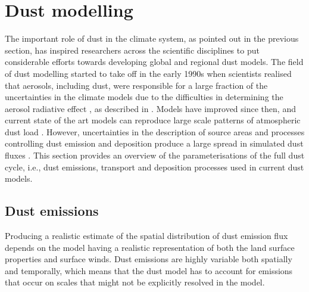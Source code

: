 \section{Dust modelling}\label{sec:dust_modelling}
The important role of dust in the climate system, as pointed out in the previous section, has inspired researchers across the scientific disciplines to put considerable efforts towards developing global and regional dust models. 
The field of dust modelling started to take off in the early 1990s when scientists realised that aerosols, including dust, were responsible for a large fraction of the uncertainties in the climate models due to the difficulties in determining the aerosol radiative effect \parencite{tegen1996influence}, as described in . 
Models have improved since then, and current state of the art models can reproduce large scale patterns of atmospheric dust load \parencite{huneeus2011global}. 
However, uncertainties in the description of source areas and processes controlling dust emission and deposition produce a large spread in simulated dust fluxes \parencite{huneeus2011global}. 
This section provides an overview of the parameterisations of the full dust cycle, i.e., dust emissions, transport and deposition processes used in current dust models. 
 
\subsection{Dust emissions}\label{sec:dust_emission_modelling}
Producing a realistic estimate of the spatial distribution of dust emission flux depends on the model having a realistic representation of both the land surface properties and surface winds. Dust emissions are highly variable both spatially and temporally, which means that the dust model has to account for emissions that occur on scales that might not be explicitly resolved in the model.        

